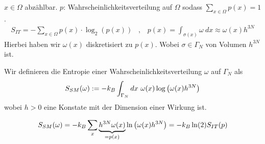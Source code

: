 \begin{definition}
    $x \in \Omega$ abzählbar. $p$: Wahrscheinlichkeitsverteilung auf $\Omega$
    sodass $\sum_{x \in \Omega} p(x) = 1$.
    \begin{align*}
        S_{IT} = - \sum_{x \in \Omega} p(x) \cdot \log_2 (p(x))
        \hspace{10pt} , \hspace{10pt}
        p(x) = \int_{\sigma(x)} \omega \ dx \approx \omega(x) h^{3N}
    \end{align*}
    Hierbei haben wir $\omega(x)$ diskretisiert zu $p(x)$.
    Wobei $\sigma \in \Gamma_N$ von Volumen $h^{3N}$ ist.
\end{definition}

\begin{definition}
    Wir definieren die Entropie einer Wahrscheinlichkeitsverteilung $\omega$
    auf $\Gamma_N$ als
    \begin{align*}
        S_{SM}(\omega) := - k_B \int_{\Gamma_N} dx \ \omega(x) \log \left( \omega(x) h^{3N} \right)
    \end{align*}
    wobei $h>0$ eine Konstate mit der Dimension einer Wirkung ist.
\end{definition}

\begin{bemerkung}
    \begin{align*}
        S_{SM}(\omega) = - k_B \sum_x \underbrace{h^{3N} \omega(x)}_{= p(x)} \ln \left( \omega(x) h^{3N} \right)
        = - k_B \ln(2) S_{IT}(p)
    \end{align*}
\end{bemerkung}


